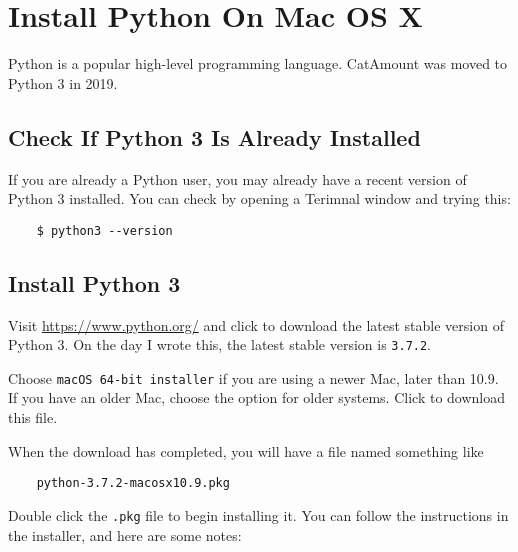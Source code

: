 \chapter{Install Python On Mac OS X}
\hypertarget{macosx-install-python}{}

Python is a popular high-level programming language. CatAmount was
moved to Python 3 in 2019.

\section{Check If Python 3 Is Already Installed}

If you are already a Python user, you may already have a recent
version of Python 3 installed. You can check by opening a Terimnal
window and trying this:

\begin{verbatim}
    $ python3 --version
\end{verbatim}

\section{Install Python 3}

Visit \url{https://www.python.org/} and click to download the latest stable version
of Python 3. On the day I wrote this, the latest stable version
is \texttt{3.7.2}.

Choose \texttt{macOS 64-bit installer} if you are using a newer
Mac, later than 10.9. If you have an older Mac, choose the option
for older systems. Click to download this file.

When the download has completed, you will have a file named something like

\begin{verbatim}
    python-3.7.2-macosx10.9.pkg
\end{verbatim}

Double click the \texttt{.pkg} file to begin installing it. You can
follow the instructions in the installer, and here are some notes:

